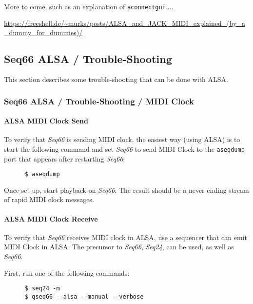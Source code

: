    More to come, such as an explanation of \texttt{aconnectgui}....

   \url{https://freeshell.de/~murks/posts/ALSA_and_JACK_MIDI_explained_(by_a_dummy_for_dummies)/}

\subsection{Seq66 ALSA / Trouble-Shooting}
\label{subsec:alsa_testing}

   This section describes some trouble-shooting that can be done with ALSA.

\subsubsection{Seq66 ALSA / Trouble-Shooting / MIDI Clock}
\label{subsubsec:alsa_testing_midi_clock}

\paragraph{ALSA MIDI Clock Send}
\label{paragraph:alsa_testing_midi_clock_send}

   To verify that \textsl{Seq66} is sending MIDI clock, the easiest way (using
   ALSA) is to start the following command and set \textsl{Seq66} to send
   MIDI Clock to the \texttt{aseqdump} port that appears after restarting
   \textsl{Seq66}:

   \begin{verbatim}
      $ aseqdump
   \end{verbatim}

   Once set up, start playback on \textsl{Seq66}.
   The result should be a never-ending stream of rapid MIDI clock messages.

\paragraph{ALSA MIDI Clock Receive}
\label{paragraph:alsa_testing_midi_clock_receive}

   To verify that \textsl{Seq66} receives MIDI clock in ALSA, use a sequencer
   that can emit MIDI Clock in ALSA.  The precursor to \textsl{Seq66},
   \textsl{Seq24}, can be used, as well as \textsl{Seq66}.

   First, run one of the following commands:

   \begin{verbatim}
      $ seq24 -m
      $ qseq66 --alsa --manual --verbose
   \end{verbatim}

